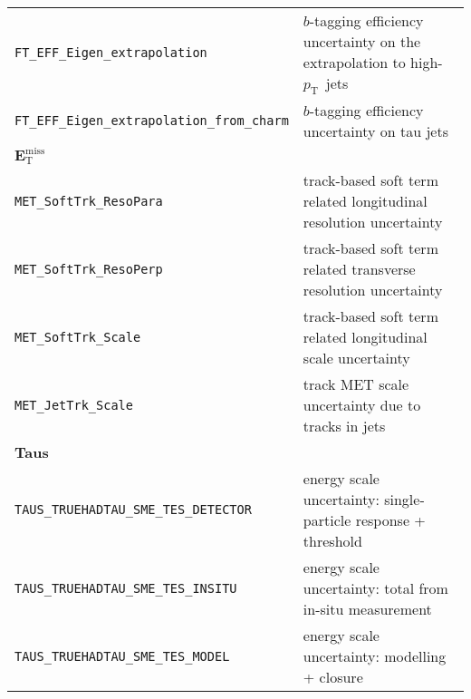 \begin{longtable}{lL}
  \texttt{FT\_EFF\_Eigen\_extrapolation} & $b$-tagging efficiency uncertainty on the extrapolation to high-$p_{\mathrm{T}}$\ jets \\
  \texttt{FT\_EFF\_Eigen\_extrapolation\_from\_charm} & $b$-tagging efficiency uncertainty on tau jets \\
  {\bfseries $\bm{E}_{\mathrm{T}}^{\text{miss}}$}&\\
  \texttt{MET\_SoftTrk\_ResoPara} & track-based soft term related longitudinal resolution uncertainty \\
  \texttt{MET\_SoftTrk\_ResoPerp} &  track-based soft term related transverse resolution uncertainty \\
  \texttt{MET\_SoftTrk\_Scale} & track-based soft term related longitudinal scale uncertainty \\
  \texttt{MET\_JetTrk\_Scale} & track MET scale uncertainty due to tracks in jets \\
  {\bfseries Taus}&\\
  \texttt{TAUS\_TRUEHADTAU\_SME\_TES\_DETECTOR} & energy scale uncertainty: single-particle response + threshold \\
  \texttt{TAUS\_TRUEHADTAU\_SME\_TES\_INSITU} & energy scale uncertainty: total from in-situ measurement \\
  \texttt{TAUS\_TRUEHADTAU\_SME\_TES\_MODEL} & energy scale uncertainty: modelling + closure \\
  \bottomrule
\end{longtable}